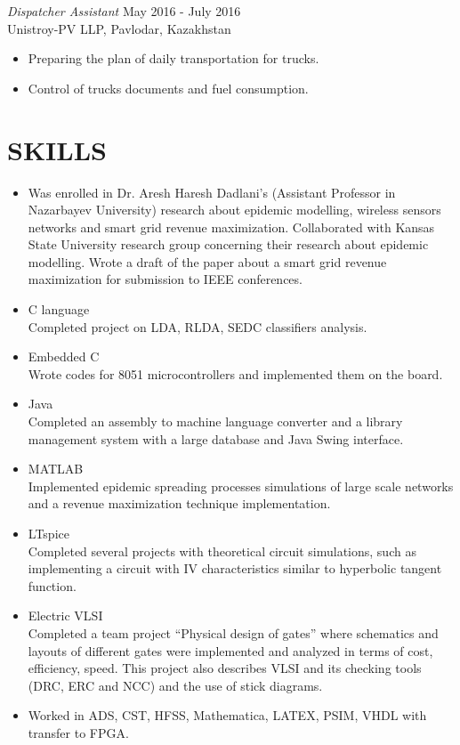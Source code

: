 \documentclass[margin, 10pt]{res} %
\begin{document}
\begin{resume}
{\sl Dispatcher Assistant} \hfill May 2016 - July 2016 \\
Unistroy-PV LLP, Pavlodar, Kazakhstan
\begin{itemize}
\item Preparing the plan of daily transportation for trucks.
\item Control of trucks documents and fuel consumption.
\end{itemize} 




\section{SKILLS} 

\begin{itemize}
\item Was enrolled in Dr. Aresh Haresh Dadlani's (Assistant Professor in Nazarbayev University) research about epidemic modelling, wireless sensors networks and smart grid revenue maximization. Collaborated with Kansas State University research group concerning their research about epidemic modelling. Wrote a draft of the paper about a smart grid revenue maximization for submission to IEEE conferences.
\item C language\\
Completed project on LDA, RLDA, SEDC classifiers analysis.
\item Embedded C\\
Wrote codes for 8051 microcontrollers and implemented them on the board.
\item Java\\
Completed an assembly to machine language converter and a library management system with a large database and Java Swing interface.
\item MATLAB\\
Implemented epidemic spreading processes simulations of large scale networks and a revenue maximization technique implementation.
\item LTspice\\
Completed several projects with theoretical circuit simulations, such as implementing a circuit with IV characteristics similar to hyperbolic tangent function. 
\item Electric VLSI\\ 
Completed a team project “Physical design of gates” where schematics and layouts of different gates were implemented and analyzed in terms of cost, efficiency, speed. This project also describes VLSI and its checking tools (DRC, ERC and NCC) and the use of stick diagrams.
\item Worked in ADS, CST, HFSS, Mathematica, LATEX, PSIM, VHDL with transfer to FPGA.



\end{itemize}
\end{resume}
\end{document}
